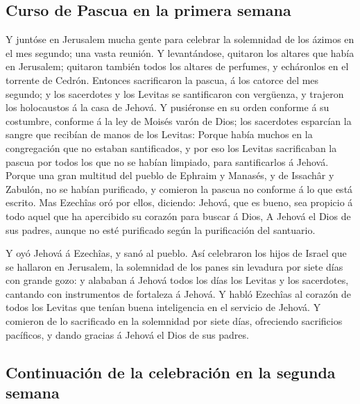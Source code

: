 \hypertarget{curso-de-pascua-en-la-primera-semana}{%
\subsection{Curso de Pascua en la primera
semana}\label{curso-de-pascua-en-la-primera-semana}}

 Y juntóse en Jerusalem mucha gente para celebrar la
solemnidad de los ázimos en el mes segundo; una vasta reunión.
 Y levantándose, quitaron los altares que había en
Jerusalem; quitaron también todos los altares de perfumes, y echáronlos
en el torrente de Cedrón.  Entonces sacrificaron la
pascua, á los catorce del mes segundo; y los sacerdotes y los Levitas se
santificaron con vergüenza, y trajeron los holocaustos á la casa de
Jehová.  Y pusiéronse en su orden conforme á su
costumbre, conforme á la ley de Moisés varón de Dios; los sacerdotes
esparcían la sangre que recibían de manos de los Levitas:
 Porque había muchos en la congregación que no estaban
santificados, y por eso los Levitas sacrificaban la pascua por todos los
que no se habían limpiado, para santificarlos á Jehová. 
Porque una gran multitud del pueblo de Ephraim y Manasés, y de Issachâr
y Zabulón, no se habían purificado, y comieron la pascua no conforme á
lo que está escrito. Mas Ezechîas oró por ellos, diciendo: Jehová, que
es bueno, sea propicio á todo aquel que ha apercibido su corazón para
buscar á Dios,  A Jehová el Dios de sus padres, aunque no
esté purificado según la purificación del santuario.

 Y oyó Jehová á Ezechîas, y sanó al pueblo.
 Así celebraron los hijos de Israel que se hallaron en
Jerusalem, la solemnidad de los panes sin levadura por siete días con
grande gozo: y alababan á Jehová todos los días los Levitas y los
sacerdotes, cantando con instrumentos de fortaleza á Jehová.
 Y habló Ezechîas al corazón de todos los Levitas que
tenían buena inteligencia en el servicio de Jehová. Y comieron de lo
sacrificado en la solemnidad por siete días, ofreciendo sacrificios
pacíficos, y dando gracias á Jehová el Dios de sus padres.

\hypertarget{continuaciuxf3n-de-la-celebraciuxf3n-en-la-segunda-semana}{%
\subsection{Continuación de la celebración en la segunda
semana}\label{continuaciuxf3n-de-la-celebraciuxf3n-en-la-segunda-semana}}

